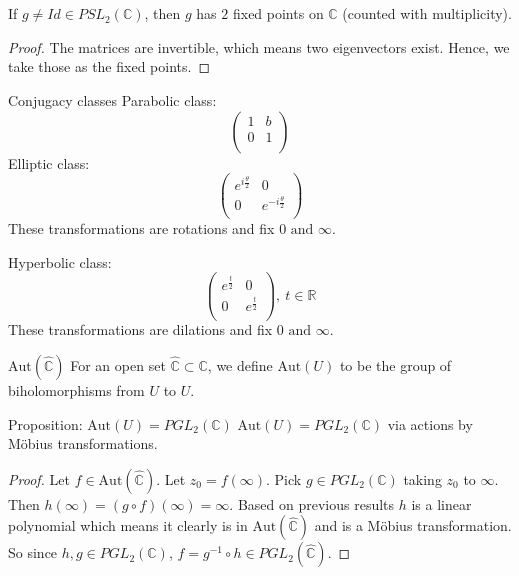 \documentclass{article}
\begin{document}
\begin{lem}{}{}
If \( g \neq Id \in PSL_2(\mathbb{C} ) \), then \( g \) has \( 2 \) fixed points on \( \hat{\mathbb{C}}  \) (counted with multiplicity).
\tcbline
\begin{proof}
The matrices are invertible, which means two eigenvectors exist. Hence, we take those as the fixed points. 
\end{proof}

\end{lem}

\begin{exmp}{Conjugacy classes}{}
Parabolic class:
\[
    \begin{pmatrix}
        1 &  b \\
        0 &  1 \\
    \end{pmatrix}
\]
Elliptic class:
\[
    \begin{pmatrix}
        e^{i \frac{\theta}{2}} &  0 \\
        0 &  e^{- i \frac{\theta}{2}} \\
    \end{pmatrix}
\]
These transformations are rotations and fix \( 0 \text{ and } \infty  \).

Hyperbolic class:
\[
    \begin{pmatrix}
        e^{ \frac{t}{2}} &  0 \\
        0 &  e^{ \frac{t}{2}} \\
    \end{pmatrix} , \ t \in \mathbb{R} 
\]
These transformations are dilations and fix \( 0 \text{ and } \infty  \).
\end{exmp}

\begin{defn}{\( \mathrm{Aut} (\hat{\mathbb{C}} ) \) }{}
For an open set \( \hat{\mathbb{C}}  \subset \mathbb{C}  \), we define \( \mathrm{Aut} (U) \) to be the group of biholomorphisms from \( U \) to \( U \). 
\end{defn}
\begin{misc}{Proposition: \( \mathrm{Aut} (U)  = PGL_2(\mathbb{C} )\)}{}
    \( \mathrm{Aut} (U)  = PGL_2(\mathbb{C} )\) via actions by Möbius transformations.

    \tcbline

    \begin{proof}
    Let \( f \in \mathrm{Aut} (\hat{\mathbb{C}}     ) \). Let \( z_0 = f( \infty ) \). Pick \( g \in PGL_2(\mathbb{C} ) \) taking \( z_0 \) to \( \infty  \). Then \( h ( \infty )= (g \circ f) ( \infty ) = \infty   \). Based on previous results \( h \) is a linear polynomial which means it clearly is in \( \mathrm{Aut}(\hat{\mathbb{C}} )  \) and is a Möbius transformation. So since \( h, g \in PGL_2(\mathbb{C} ) \), \( f = g^{-1} \circ h \in PGL_2(\hat{\mathbb{C}} ).\) 
    \end{proof}
    
\end{misc}
\end{document}
